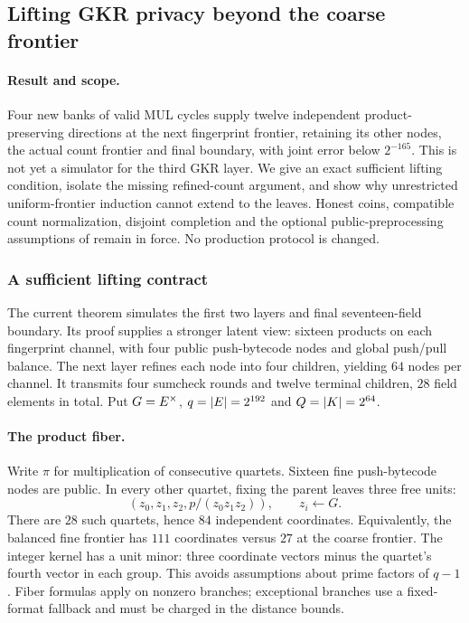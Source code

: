 \subsection{Lifting GKR privacy beyond the coarse frontier}\label{note:zk-frontier-lifting}

\paragraph{Result and scope.} Four new banks of valid MUL cycles supply twelve independent product-preserving directions at the next fingerprint frontier, retaining its other nodes, the actual count frontier and final boundary, with joint error below $2^{-165}$. This is not yet a simulator for the third GKR layer. We give an exact sufficient lifting condition, isolate the missing refined-count argument, and show why unrestricted uniform-frontier induction cannot extend to the leaves. Honest coins, compatible count normalization, disjoint completion and the optional public-preprocessing assumptions of  remain in force. No production protocol is changed.

\subsubsection{A sufficient lifting contract}

The current theorem simulates the first two layers and final seventeen-field boundary. Its proof supplies a stronger latent view: sixteen products on each fingerprint channel, with four public push-bytecode nodes and global push/pull balance. The next layer refines each node into four children, yielding $64$ nodes per channel. It transmits four sumcheck rounds and twelve terminal children, $28$ field elements in total. Put $G=E^\times$, $q=|E|=2^{192}$ and $Q=|K|=2^{64}$.

\paragraph{The product fiber.} Write $\pi$ for multiplication of consecutive quartets. Sixteen fine push-bytecode nodes are public. In every other quartet, fixing the parent leaves three free units:
\[
 (z_0,z_1,z_2,p/(z_0z_1z_2)),\qquad z_i\gets G.
\]
There are $28$ such quartets, hence $84$ independent coordinates. Equivalently, the balanced fine frontier has $111$ coordinates versus $27$ at the coarse frontier. The integer kernel has a unit minor: three coordinate vectors minus the quartet's fourth vector in each group. This avoids assumptions about prime factors of $q-1$. Fiber formulas apply on nonzero branches; exceptional branches use a fixed-format fallback and must be charged in the distance bounds.

